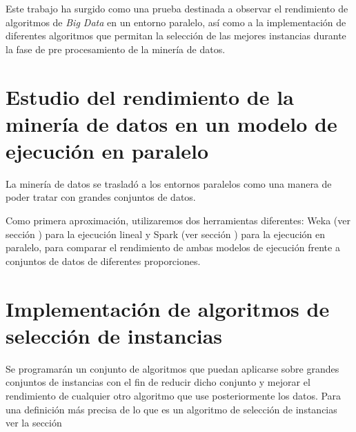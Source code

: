 


Este trabajo ha surgido como una prueba destinada a observar el rendimiento de algoritmos de \textit{Big Data} en un entorno paralelo, así como a la implementación de diferentes algoritmos que permitan la selección de las mejores instancias durante la fase de pre procesamiento de la minería de datos.

\section{Estudio del rendimiento de la minería de datos en un modelo de ejecución en paralelo}

La minería de datos se trasladó a los entornos paralelos como una manera de poder tratar con grandes conjuntos de datos.

Como primera aproximación, utilizaremos dos herramientas diferentes: Weka (ver sección ) para la ejecución lineal y Spark (ver sección ) para la ejecución en paralelo, para comparar el rendimiento de ambas modelos de ejecución frente a conjuntos de datos de diferentes proporciones.


\section{Implementación de algoritmos de selección de instancias}

Se programarán un conjunto de algoritmos que puedan aplicarse sobre grandes conjuntos de instancias con el fin de reducir dicho conjunto y mejorar el rendimiento de cualquier otro algoritmo que use posteriormente los datos. Para una definición más precisa de lo que es un algoritmo de selección de instancias ver la sección 

